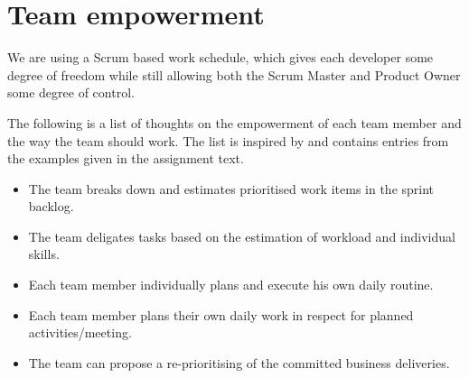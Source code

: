 \section{Team empowerment}

We are using a Scrum based work schedule, which gives each developer some degree of freedom while still allowing both the Scrum Master
and Product Owner some degree of control.

The following is a list of thoughts on the empowerment of each team member and the way the team should work. The list is inspired by and contains entries from the examples given in the assignment text.
\begin{itemize}
    \item The team breaks down and estimates prioritised work items in the sprint backlog.
    \item The team deligates tasks based on the estimation of workload and individual skills.
    \item Each team member individually plans and execute his own daily routine.
    \item Each team member plans their own daily work in respect for planned activities/meeting.
    \item The team can propose a re-prioritising of the committed business deliveries.
\end{itemize}
